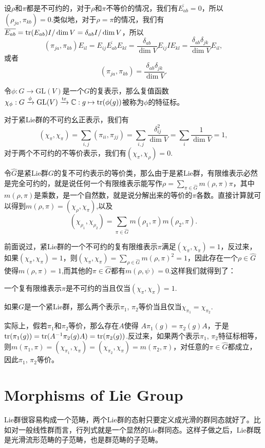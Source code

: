 \para 设$\rho$和$\pi$都是不可约的，对于$\rho$和$\pi$不等价的情况，我们有$\overline{E_{ab}}=0$，所以$\left(\rho_{ja},\pi_{kb}\right)=0$.类似地，对于$\rho=\pi$的情况，我们有$\overline{E_{ab}}=\operatorname{tr}(E_{ab})I/\dim V=\delta_{ab}I/\dim V$，所以
\[
	\left(\pi_{ja},\pi_{kb}\right)E_{il}=E_{ij}\overline{E_{ab}}E_{kl}=\frac{\delta_{ab}}{\dim V}E_{ij}IE_{kl}=\frac{\delta_{ab}\delta_{jk}}{\dim V}E_{il},
\]
或者
\[
	\left(\pi_{ja},\pi_{kb}\right)=\frac{\delta_{ab}\delta_{jk}}{\dim V}.
\]

\para 令$\phi:G\to \mathrm{GL}(V)$是一个$G$的复表示，那么复值函数$\chi_\phi:G\xrightarrow{\phi}\mathrm{GL}(V)\xrightarrow{\operatorname{tr}}\mathbb{C}:g\mapsto \operatorname{tr}(\phi(g))$被称为$\phi$的特征标。

对于紧Lie群的不可约幺正表示，我们有
\[
(\chi_\pi, \chi_\pi)=\sum_{i,j}(\pi_{ii},\pi_{jj})=\sum_{i,j}\frac{\delta_{ij}^2}{\dim V}=\sum_{i}\frac{1}{\dim V}=1,
\]
对于两个不可约的不等价表示，我们有$(\chi_\pi, \chi_\rho)=0$.

令$\hat{G}$是紧Lie群$G$的复不可约表示的等价类，那么由于是紧Lie群，有限维表示必然是完全可约的，就是说任何一个有限维表示能写作$\rho=\sum_{\pi\in\hat{G}}m(\rho,\pi)\pi$，其中$m(\rho,\pi)$是乘数，是一个自然数，就是说分解出来的等价的$\pi$各数。直接计算就可以得到$m(\rho,\pi)=(\chi_\rho,\chi_\pi)$,以及
\[
	(\chi_{\rho_1},\chi_{\rho_2})=\sum_{\pi\in\hat{G}}m(\rho_1,\pi)m(\rho_2,\pi).
\]

前面说过，紧Lie群的一个不可约的复有限维表示$\pi$满足$(\chi_\pi, \chi_\pi)=1$，反过来，如果$(\chi_\pi, \chi_\pi)=1$，则$(\chi_{\pi},\chi_{\pi})=\sum_{\rho\in\hat{G}}m(\rho,\pi)^2=1$，因此存在一个$\rho\in\hat{G}$使得$m(\rho,\pi)=1$,而其他的$\pi\in\hat{G}$都有$m(\rho,\psi)=0$.这样我们就得到了：

\para 一个复有限维表示$\pi$是不可约的当且仅当$(\chi_{\pi},\chi_{\pi})=1$.

\pro 如果$G$是一个紧Lie群，那么两个表示$\pi_1$, $\pi_2$等价当且仅当$\chi_{\pi_1}=\chi_{\pi_2}$.

实际上，假若$\pi_1$和$\pi_2$等价，那么存在$A$使得
$A\pi_1(g)=\pi_2(g)A$，于是$\operatorname{tr}(\pi_1(g))=\operatorname{tr}(A^{-1}\pi_2(g)A)=\operatorname{tr}(\pi_2(g))$.反过来，如果两个表示$\pi_1$, $\pi_2$特征标相等，则$	m(\pi_1,\pi)=(\chi_{\pi_1},\chi_\pi)=(\chi_{\pi_2},\chi_\pi)=m(\pi_2,\pi)$，对任意的$\pi\in\hat{G}$都成立，因此$\pi_1$, $\pi_2$等价。

\section{Morphisms of Lie Group}

Lie群很容易构成一个范畴，两个Lie群的态射只要定义成光滑的群同态就好了。比如对一般线性群而言，行列式就是一个显然的Lie群同态。这样子做之后，Lie群既是光滑流形范畴的子范畴，也是群范畴的子范畴。


